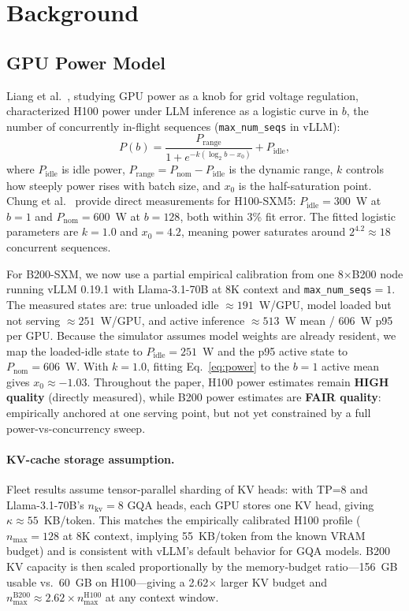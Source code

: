 \documentclass[11pt,a4paper]{article}
\newcommand{\Pidle}{P_{\text{idle}}}
\newcommand{\Pnom}{P_{\text{nom}}}
\newcommand{\Prange}{P_{\text{range}}}
\begin{document}
\section{Background}
\label{sec:background}

\subsection{GPU Power Model}
\label{sec:power}

Liang et al.\ \citep{liang2026g2g}, studying GPU power as a knob for grid
voltage regulation, characterized H100 power under LLM inference as a logistic
curve in $b$, the number of concurrently in-flight sequences
(\texttt{max\_num\_seqs} in vLLM):
\begin{equation}
  P(b) = \frac{\Prange}{1 + e^{-k(\log_2 b - x_0)}} + \Pidle,
  \label{eq:power}
\end{equation}
where $\Pidle$ is idle power, $\Prange = \Pnom - \Pidle$ is the dynamic range,
$k$ controls how steeply power rises with batch size, and $x_0$ is the
half-saturation point.  Chung et al.~\citep{chung2026mlenergy}
provide direct measurements for H100-SXM5: $\Pidle = 300$~W at $b{=}1$ and
$\Pnom = 600$~W at $b{=}128$, both within 3\% fit error.  The fitted logistic
parameters are $k = 1.0$ and $x_0 = 4.2$, meaning power saturates around
$2^{4.2} \approx 18$ concurrent sequences.

For B200-SXM, we now use a partial empirical calibration from one
8$\times$B200 node running vLLM 0.19.1 with Llama-3.1-70B at 8K context and
\texttt{max\_num\_seqs}$=1$.  The measured states are: true unloaded idle
$\approx 191$~W/GPU, model loaded but not serving $\approx 251$~W/GPU, and
active inference $\approx 513$~W mean / $606$~W p95 per GPU.  Because the
simulator assumes model weights are already resident, we map the loaded-idle
state to $\Pidle = 251$~W and the p95 active state to
$\Pnom = 606$~W.  With $k=1.0$, fitting Eq.~\eqref{eq:power} to the $b{=}1$
active mean gives $x_0 \approx -1.03$.  Throughout the paper, H100 power
estimates remain \textbf{HIGH quality} (directly measured), while B200 power
estimates are \textbf{FAIR quality}: empirically anchored at one serving point,
but not yet constrained by a full power-vs-concurrency sweep.

\paragraph{KV-cache storage assumption.}
Fleet results assume tensor-parallel sharding of KV heads: with TP=8 and
Llama-3.1-70B's $n_{\text{kv}} = 8$ GQA heads, each GPU stores one KV head,
giving $\kappa \approx 55$~KB/token.  This matches the empirically calibrated
H100 profile ($n_{\max} = 128$ at 8K context, implying 55~KB/token from the
known VRAM budget) and is consistent with vLLM's default behavior for GQA
models.  B200 KV capacity is then scaled proportionally by the memory-budget
ratio---156~GB usable vs.\ 60~GB on H100---giving a 2.62$\times$ larger KV
budget and $n_{\max}^{\text{B200}} \approx 2.62 \times n_{\max}^{\text{H100}}$
at any context window.
\end{document}
